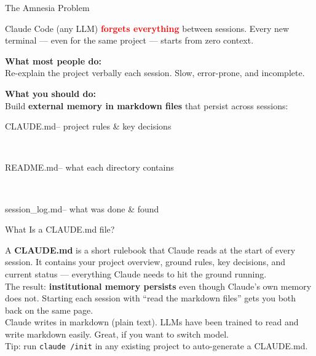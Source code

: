 \documentclass[aspectratio=169, 11pt]{beamer}
\newcommand{\emphgold}[1]{\alert{\textbf{#1}}}
\newcommand{\emphcoral}[1]{\textcolor{red}{\textbf{#1}}}
\newcommand{\codett}[1]{{\ttfamily\scriptsize\raggedright\hyphenpenalty=50\exhyphenpenalty=50 #1}}
\begin{document}
\begin{frame}{The Amnesia Problem}
\begin{warningbox}
  {\small Claude Code (any LLM) \emphcoral{forgets everything} between sessions. Every new terminal --- even for the same project --- starts from zero context.}
\end{warningbox}
\vspace{0.1cm}
  {\small\bfseries\color{navy} What most people do:}\\[0.03cm]
  {\small Re-explain the project verbally each session. Slow, error-prone, and incomplete.}
  \vspace{0.15cm}

  {\small\bfseries\color{navy} What you should do:}\\[0.03cm]
  {\small Build \emphgold{external memory in markdown files} that persist across sessions:}
  \vspace{0.05cm}
  \begin{codeblock}
    \codett{\textcolor{warmgold}{CLAUDE.md}\quad\textcolor{slate}{-- project rules \& key decisions}}\\
    \codett{\textcolor{warmgold}{README.md}\quad\textcolor{slate}{-- what each directory contains}}\\
    \codett{\textcolor{warmgold}{session\_log.md}\;\textcolor{slate}{-- what was done \& found}}
  \end{codeblock}
\end{frame}

\begin{frame}{What Is a CLAUDE.md file?}
  \begin{keyinsight}
    A \emphgold{CLAUDE.md} is a short rulebook that Claude reads at the start of every session. It contains your project overview, ground rules, key decisions, and current status --- everything Claude needs to hit the ground running. \\[6pt]
    The result: \emphgold{institutional memory persists} even though Claude's own memory does not. Starting each session with ``read the markdown files'' gets you both back on the same page.\\[6pt]
    Claude writes in markdown (plain text). LLMs have been trained to read and write markdown easily. Great, if you want to switch model.\\[6pt]
    {\scriptsize\color{slate} Tip: run \texttt{claude /init} in any existing project to auto-generate a CLAUDE.md.}
  \end{keyinsight}
\end{frame}
\end{document}
